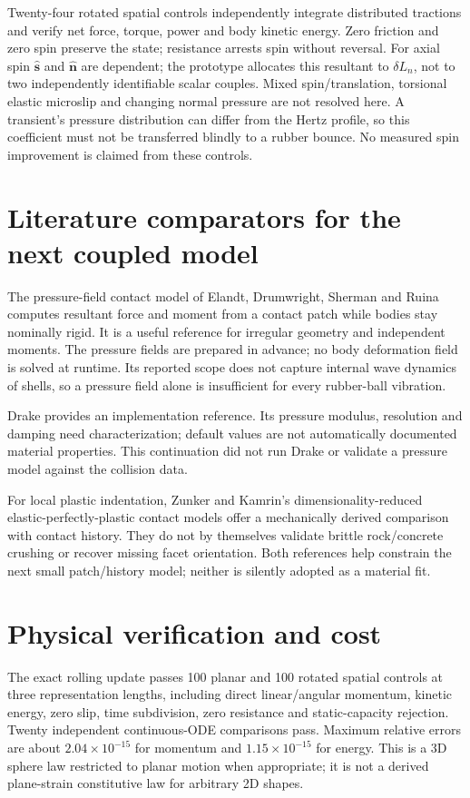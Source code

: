 \documentclass[10pt,a4paper]{article}
\begin{document}
Twenty-four rotated spatial controls independently integrate distributed tractions
and verify net force, torque, power and body kinetic energy. Zero friction and
zero spin preserve the state; resistance arrests spin without reversal.
For axial spin $\hat{\mathbf s}$ and $\hat{\mathbf n}$ are dependent; the prototype
allocates this resultant to $\delta L_n$, not to two independently identifiable
scalar couples. Mixed spin/translation, torsional elastic microslip and changing
normal pressure are not resolved here. A transient's pressure distribution can
differ from the Hertz profile, so this coefficient must not be transferred blindly
to a rubber bounce. No measured spin improvement is claimed from these controls.

\section*{Literature comparators for the next coupled model}
The pressure-field contact model of Elandt, Drumwright, Sherman and Ruina computes
resultant force and moment from a contact patch while bodies stay nominally rigid.
It is a useful reference for irregular geometry and independent moments. The
pressure fields are prepared in advance; no body deformation field is solved at
runtime. Its reported scope does not capture internal wave dynamics of shells,
so a pressure field alone is insufficient for every rubber-ball vibration.

Drake provides an implementation reference. Its pressure modulus, resolution and
damping need characterization; default values are not automatically documented
material properties. This continuation did not run Drake or validate a pressure
model against the collision data.

For local plastic indentation, Zunker and Kamrin's dimensionality-reduced
elastic-perfectly-plastic contact models offer a mechanically derived comparison
with contact history. They do not by themselves validate brittle rock/concrete
crushing or recover missing facet orientation. Both references help constrain
the next small patch/history model; neither is silently adopted as a material fit.

\newpage
\section*{Physical verification and cost}
The exact rolling update passes 100 planar and 100 rotated spatial controls at
three representation lengths, including direct linear/angular momentum, kinetic
energy, zero slip, time subdivision, zero resistance and static-capacity rejection.
Twenty independent continuous-ODE comparisons pass. Maximum relative errors are
about $2.04\times10^{-15}$ for momentum and $1.15\times10^{-15}$ for energy.
This is a 3D sphere law restricted to planar motion when appropriate; it is not a
derived plane-strain constitutive law for arbitrary 2D shapes.
\end{document}
